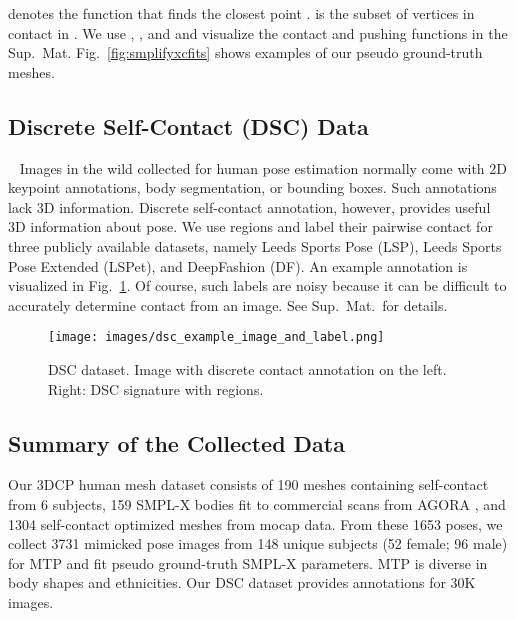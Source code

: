 \documentclass[final]{cvpr}
\newcommand{\suppmat}{Sup.~Mat.\xspace}
\theoremstyle{definition}
\begin{document}
 denotes the function that finds the closest point .  is the subset of vertices in contact in . 
We use , , and  and visualize the contact and pushing functions in the {\suppmat} 
Fig.~\ref{fig:smplifyxcfits} shows examples of our pseudo ground-truth meshes.

\subsection{Discrete Self-Contact (DSC) Data}~\label{subsection-dsc}
Images in the wild collected for human pose estimation normally come with 2D keypoint annotations, body segmentation, or bounding boxes. 
Such annotations lack 3D information. 
Discrete self-contact annotation, however, provides useful 3D information about pose. 
We use  regions and label their pairwise contact for three publicly available datasets, namely Leeds Sports Pose (LSP), Leeds Sports Pose Extended (LSPet), and DeepFashion (DF). An example annotation is visualized in Fig.~\ref{fig:DFExamples}.
Of course, such labels are noisy because it can be difficult to accurately determine contact from an image. See \suppmat~for details.

\begin{figure}
\centerline{		\texttt{[image: images/dsc\_example\_image\_and\_label.png]} }
\vspace{-0.04in}
	\caption{DSC dataset. Image with discrete contact annotation on the left. Right: DSC signature with  regions.}
	\label{fig:DFExamples}
\end{figure}

\subsection{Summary of the Collected Data}
Our 3DCP human mesh dataset consists of 190 meshes containing self-contact from 6 subjects, 159 SMPL-X bodies fit to commercial scans from AGORA \cite{patel2021agora}, and 1304 self-contact optimized meshes from mocap data. From these 1653 poses, we collect 3731 mimicked pose images from 148 unique subjects (52 female; 96 male) for MTP and fit pseudo ground-truth SMPL-X parameters. MTP is diverse in body shapes and ethnicities. Our DSC dataset provides annotations for 30K images.
\end{document}
